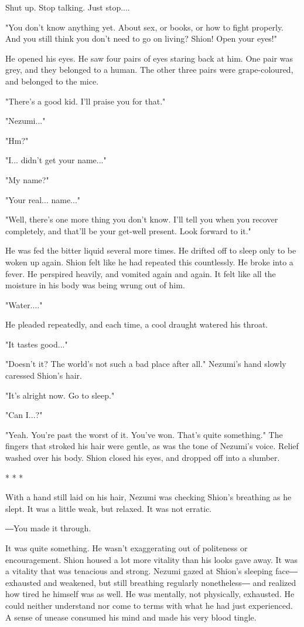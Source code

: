 Shut up. Stop talking. Just stop....

"You don't know anything yet. About sex, or books, or how to fight
properly. And you still think you don't need to go on living? Shion!
Open your eyes!"

He opened his eyes. He saw four pairs of eyes staring back at him. One
pair was grey, and they belonged to a human. The other three pairs were
grape-coloured, and belonged to the mice.

"There's a good kid. I'll praise you for that."

"Nezumi..."

"Hm?"

"I... didn't get your name..."

"My name?"

"Your real... name..."

"Well, there's one more thing you don't know. I'll tell you when you
recover completely, and that'll be your get-well present. Look forward
to it."

He was fed the bitter liquid several more times. He drifted off to sleep
only to be woken up again. Shion felt like he had repeated this
countlessly. He broke into a fever. He perspired heavily, and vomited
again and again. It felt like all the moisture in his body was being
wrung out of him.

"Water...."

He pleaded repeatedly, and each time, a cool draught watered his throat.

"It tastes good..."

"Doesn't it? The world's not such a bad place after all." Nezumi's hand
slowly caressed Shion's hair.

"It's alright now. Go to sleep."

"Can I...?"

"Yeah. You're past the worst of it. You've won. That's quite something."
The fingers that stroked his hair were gentle, as was the tone of
Nezumi's voice. Relief washed over his body. Shion closed his eyes, and
dropped off into a slumber.

* * *

With a hand still laid on his hair, Nezumi was checking Shion's
breathing as he slept. It was a little weak, but relaxed. It was not
erratic.

―You made it through.

It was quite something. He wasn't exaggerating out of politeness or
encouragement. Shion housed a lot more vitality than his looks gave
away. It was a vitality that was tenacious and strong. Nezumi gazed at
Shion's sleeping face― exhausted and weakened, but still breathing
regularly nonetheless― and realized how tired he himself was as well. He
was mentally, not physically, exhausted. He could neither understand nor
come to terms with what he had just experienced. A sense of unease
consumed his mind and made his very blood tingle.

